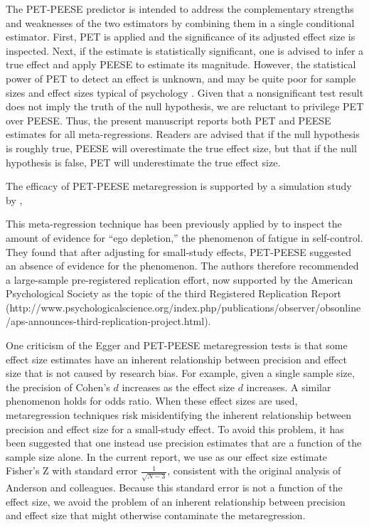 \documentclass[man]{apa6}
\begin{document}
The PET-PEESE predictor is intended to address the complementary strengths and weaknesses of the two estimators by combining them in a single conditional estimator. First, PET is applied and the significance of its adjusted effect size is inspected. Next, if the estimate is statistically significant, one is advised to infer a true effect and apply PEESE to estimate its magnitude. However, the statistical power of PET to detect an effect is unknown, and may be quite poor for sample sizes and effect sizes typical of psychology \citet{blogposts}. Given that a nonsignificant test result does not imply the truth of the null hypothesis, we are reluctant to privilege PET over PEESE. Thus, the present manuscript reports both PET and PEESE estimates for all meta-regressions. Readers are advised that if the null hypothesis is roughly true, PEESE will overestimate the true effect size, but that if the null hypothesis is false, PET will underestimate the true effect size.

The efficacy of PET-PEESE metaregression is supported by a simulation study by \citet{Moreno:etal:2006}, 

This meta-regression technique has been previously applied by \citet{Carter:McCullough:2014} to inspect the amount of evidence for ``ego depletion,'' the phenomenon of fatigue in self-control. They found that after adjusting for small-study effects, PET-PEESE suggested an absence of evidence for the phenomenon. The authors therefore recommended a large-sample pre-registered replication effort, now supported by the American Psychological Society as the topic of the third Registered Replication Report (http://www.psychologicalscience.org/index.php/publications/observer/obsonline/aps-announces-third-replication-project.html).

One criticism of the Egger and PET-PEESE metaregression tests is that some effect size estimates have an inherent relationship between precision and effect size that is not caused by research bias. For example, given a single sample size, the precision of Cohen's $d$ increases as the effect size $d$ increases. A similar phenomenon holds for odds ratio. When these effect sizes are used, metaregression techniques risk misidentifying the inherent relationship between precision and effect size for a small-study effect. To avoid this problem, it has been suggested that one instead use precision estimates that are a function of the sample size alone. In the current report, we use as our effect size estimate Fisher's Z with standard error $\frac{1}{\sqrt{N-3}}$, consistent with the original analysis of Anderson and colleagues. Because this standard error is not a function of the effect size, we avoid the problem of an inherent relationship between precision and effect size that might otherwise contaminate the metaregression.
\end{document}
